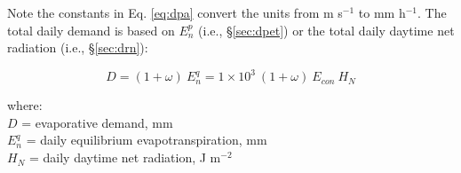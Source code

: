 \noindent Note the constants in Eq. \ref{eq:dpa} convert the units from m s$^{-1}$ to mm h$^{-1}$. 
The total daily demand is based on $E^p_n$ (i.e., \S \ref{sec:dpet}) or the total daily daytime net radiation (i.e., \S \ref{sec:drn}):

\begin{equation}
\label{eq:daydp}
	D = \left(1 + \omega \right)\: E^q_n 
	  = 1\times 10^3\:\left(1 + \omega \right)\: E_{con}\: H_N
\end{equation}

\noindent where:\\
\indent $D$ = evaporative demand, mm\\
\indent $E^q_n$ = daily equilibrium evapotranspiration, mm\\
\indent $H_N$ = daily daytime net radiation, J m$^{-2}$ \\

